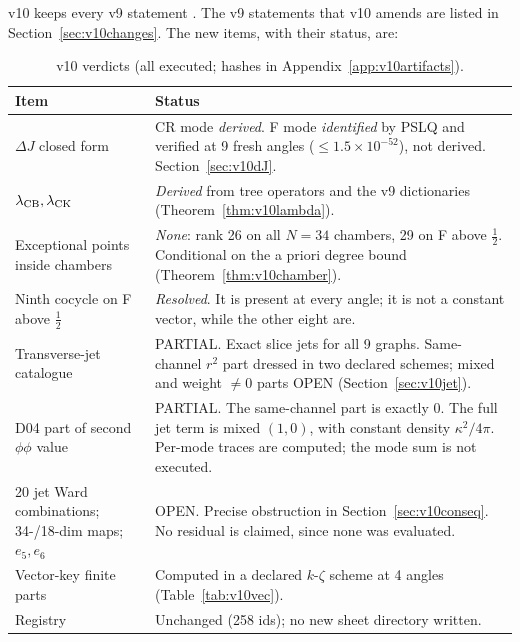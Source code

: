 \documentclass[11pt,a4paper]{article}
\newcommand{\OPEN}{\textsf{OPEN}}
\newcommand{\PARTIAL}{\textsf{PARTIAL}}
\theoremstyle{plain}
\theoremstyle{definition}
\theoremstyle{remark}
\numberwithin{equation}{section}
\begin{document}
v10 keeps every v9 statement \cite{CheungConeV9}. The v9 statements that v10 amends are
listed in Section~\ref{sec:v10changes}. The new items, with their
status, are:

\begin{center}
\small
\begin{longtable}{@{}L{.30\linewidth}L{.62\linewidth}@{}}
\caption{v10 verdicts (all executed; hashes in Appendix~\ref{app:v10artifacts}).}\label{tab:v10verdict}\\
\toprule
Item & Status\\
\midrule
\(\Delta J\) closed form & CR mode \emph{derived}. F mode \emph{identified} by PSLQ and verified at 9 fresh angles (\(\le1.5\times10^{-52}\)), not derived. Section~\ref{sec:v10dJ}.\\
\(\lambda_{\rm CB},\lambda_{\rm CK}\) & \emph{Derived} from tree operators and the v9 dictionaries (Theorem~\ref{thm:v10lambda}).\\
Exceptional points inside chambers & \emph{None}: rank 26 on all \(N=34\) chambers, 29 on F above \(\tfrac12\). Conditional on the a priori degree bound (Theorem~\ref{thm:v10chamber}).\\
Ninth cocycle on F above \(\tfrac12\) & \emph{Resolved}. It is present at every angle; it is not a constant vector, while the other eight are.\\
Transverse-jet catalogue & \PARTIAL. Exact slice jets for all 9 graphs. Same-channel \(r^2\) part dressed in two declared schemes; mixed and weight \(\ne0\) parts \OPEN{} (Section~\ref{sec:v10jet}).\\
D04 part of second \(\phi\phi\) value & \PARTIAL. The same-channel part is exactly 0. The full jet term is mixed \((1,0)\), with constant density \(\kappa^2/4\pi\). Per-mode traces are computed; the mode sum is not executed.\\
20 jet Ward combinations; 34-/18-dim maps; \(e_5,e_6\) & \OPEN. Precise obstruction in Section~\ref{sec:v10conseq}. No residual is claimed, since none was evaluated.\\
Vector-key finite parts & Computed in a declared \(k\)-\(\zeta\) scheme at 4 angles (Table~\ref{tab:v10vec}).\\
Registry & Unchanged (258 ids); no new sheet directory written.\\
\bottomrule
\end{longtable}
\end{center}

\end{document}
